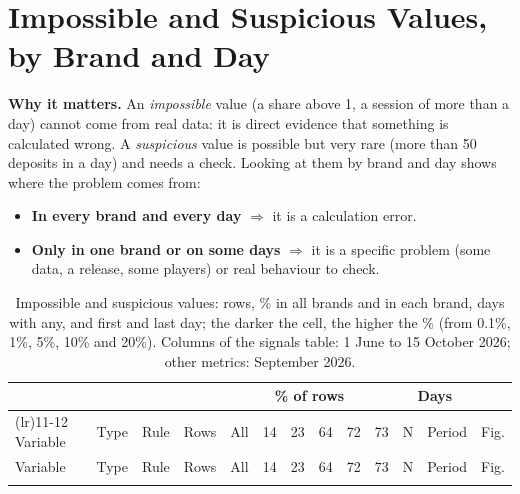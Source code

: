\documentclass[11pt,a4paper]{article}
\begin{document}
\section{Impossible and Suspicious Values, by Brand and Day}\label{sec:flags}

\textbf{Why it matters.} An \emph{impossible} value (a share above 1, a session of more than a day) cannot come from real data: it is direct evidence that something is calculated wrong. A \emph{suspicious} value is possible but very rare (more than 50 deposits in a day) and needs a check. Looking at them by brand and day shows where the problem comes from:
\begin{itemize}
  \item \textbf{In every brand and every day} $\Rightarrow$ it is a calculation error.
  \item \textbf{Only in one brand or on some days} $\Rightarrow$ it is a specific problem (some data, a release, some players) or real behaviour to check.
\end{itemize}

\begin{footnotesize}
\setlength{\tabcolsep}{2pt}
\begin{longtable}{@{}>{\raggedright\arraybackslash}p{2.5cm}l>{\raggedright\arraybackslash}p{2.1cm}rrrrrrrrlr@{}}
\caption{Impossible and suspicious values: rows, \% in all brands and in each brand, days with any, and first and last day; the darker the cell, the higher the \% (from 0.1\%, 1\%, 5\%, 10\% and 20\%). Columns of the signals table: 1 June to 15 October 2026; other metrics: September 2026.}\label{tab:flags}\\
\toprule
& & & & \multicolumn{6}{c}{\% of rows} & \multicolumn{2}{c}{Days} & \\
\cmidrule(lr){5-10}\cmidrule(lr){11-12}
Variable & Type & Rule & Rows & All & 14 & 23 & 64 & 72 & 73 & N & Period & Fig.\\
\midrule
\endfirsthead
\toprule
Variable & Type & Rule & Rows & All & 14 & 23 & 64 & 72 & 73 & N & Period & Fig.\\
\midrule
\endhead
\bottomrule
\endfoot

\end{longtable}
\end{footnotesize}
\end{document}
